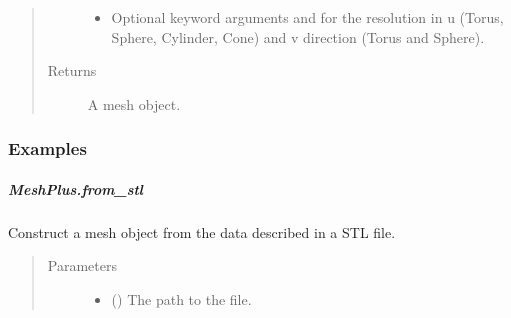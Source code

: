 \documentclass[letterpaper,10pt,english]{sphinxmanual}
\begin{document}
\begin{fulllineitems}
\begin{fulllineitems}
\begin{quote}
\begin{description}
\begin{itemize}
\item {} 
 \textendash{} Optional keyword arguments  and  for the resolution in u (Torus, Sphere, Cylinder, Cone) and v direction (Torus and Sphere).

\end{itemize}

\item[{Returns}] \leavevmode
{} \textendash{} A mesh object.

\end{description}\end{quote}
\subsubsection*{Examples}

\begin{sphinxVerbatim}[commandchars=\\\{\}]
\end{sphinxVerbatim}

\end{fulllineitems}



\subparagraph{MeshPlus.from\_stl}
\label{\detokenize{api/generated/directional_clustering.mesh.MeshPlus.from_stl:meshplus-from-stl}}\label{\detokenize{api/generated/directional_clustering.mesh.MeshPlus.from_stl::doc}}

\begin{fulllineitems}
\label{\detokenize{api/generated/directional_clustering.mesh.MeshPlus.from_stl:directional_clustering.mesh.MeshPlus.from_stl}}
Construct a mesh object from the data described in a STL file.
\begin{quote}\begin{description}
\item[{Parameters}] \leavevmode\begin{itemize}
\item {} 
 () \textendash{} The path to the file.


\end{itemize}
\end{description}
\end{quote}
\end{fulllineitems}
\end{fulllineitems}
\end{document}
